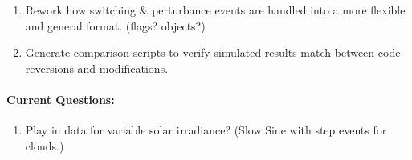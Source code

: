 \documentclass[12pt]{article}
\begin{document}
\begin{multicols}{2}
\begin{enumerate}
		\itemsep 0em 
		\item Rework how switching \& perturbance events are handled into a more flexible and general format. (flags? objects?)
		\item Generate comparison scripts to verify simulated results match  between code reversions and modifications.
		

	\end{enumerate}



\paragraph{Current Questions:}
	\begin{enumerate}
	\itemsep0em 
	
	
	\item Play in data for variable solar irradiance? (Slow Sine with step events for clouds.)
	
	\end{enumerate}	


\end{multicols}
\end{document}
